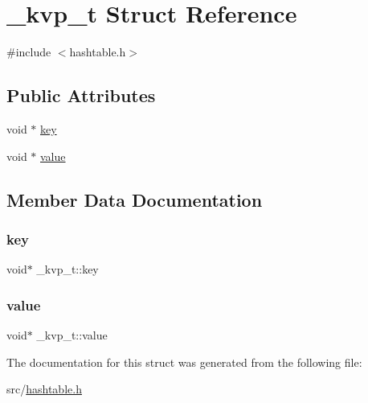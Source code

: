 \hypertarget{struct__kvp__t}{}\section{\+\_\+kvp\+\_\+t Struct Reference}
\label{struct__kvp__t}


{\ttfamily \#include $<$hashtable.\+h$>$}

\subsection*{Public Attributes}
\begin{DoxyCompactItemize}
\item 
void $\ast$ \hyperlink{struct__kvp__t_ac7702700a1b6574cfcf42eb88eb07a27}{key}
\item 
void $\ast$ \hyperlink{struct__kvp__t_a7f76aed9baea12ca271fb5d30a32e07f}{value}
\end{DoxyCompactItemize}


\subsection{Member Data Documentation}
\hypertarget{struct__kvp__t_ac7702700a1b6574cfcf42eb88eb07a27}{}\label{struct__kvp__t_ac7702700a1b6574cfcf42eb88eb07a27} 
\subsubsection{\texorpdfstring{key}{key}}
{\footnotesize\ttfamily void$\ast$ \+\_\+kvp\+\_\+t\+::key}

\hypertarget{struct__kvp__t_a7f76aed9baea12ca271fb5d30a32e07f}{}\label{struct__kvp__t_a7f76aed9baea12ca271fb5d30a32e07f} 
\subsubsection{\texorpdfstring{value}{value}}
{\footnotesize\ttfamily void$\ast$ \+\_\+kvp\+\_\+t\+::value}



The documentation for this struct was generated from the following file\+:\begin{DoxyCompactItemize}
\item 
src/\hyperlink{hashtable_8h}{hashtable.\+h}\end{DoxyCompactItemize}
